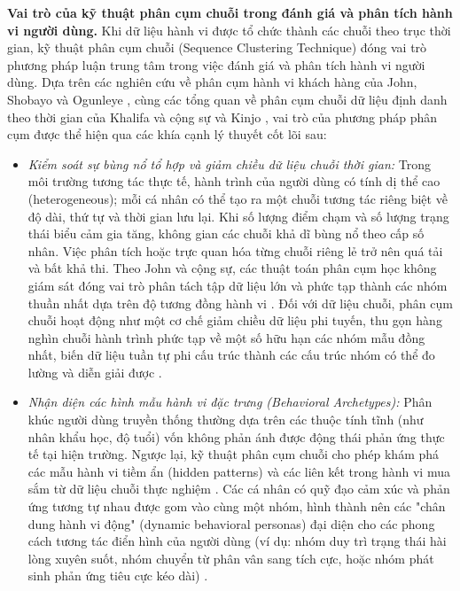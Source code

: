 \documentclass[../LuanVan.tex]{subfiles}
\begin{document}
\noindent\textbf{Vai trò của kỹ thuật phân cụm chuỗi trong đánh giá và phân tích hành vi người dùng.} Khi dữ liệu hành vi được tổ chức thành các chuỗi theo trục thời gian, kỹ thuật phân cụm chuỗi (Sequence Clustering Technique) đóng vai trò phương pháp luận trung tâm trong việc đánh giá và phân tích hành vi người dùng. Dựa trên các nghiên cứu về phân cụm hành vi khách hàng của John, Shobayo và Ogunleye \cite{john2023exploration}, cùng các tổng quan về phân cụm chuỗi dữ liệu định danh theo thời gian của Khalifa và cộng sự \cite{khalifa2026categorical} và Kinjo \cite{kinjo2025analysis}, vai trò của phương pháp phân cụm được thể hiện qua các khía cạnh lý thuyết cốt lõi sau:
\begin{itemize}
    \item \textit{Kiểm soát sự bùng nổ tổ hợp và giảm chiều dữ liệu chuỗi thời gian:} Trong môi trường tương tác thực tế, hành trình của người dùng có tính dị thể cao (heterogeneous); mỗi cá nhân có thể tạo ra một chuỗi tương tác riêng biệt về độ dài, thứ tự và thời gian lưu lại. Khi số lượng điểm chạm và số lượng trạng thái biểu cảm gia tăng, không gian các chuỗi khả dĩ bùng nổ theo cấp số nhân. Việc phân tích hoặc trực quan hóa từng chuỗi riêng lẻ trở nên quá tải và bất khả thi. Theo John và cộng sự, các thuật toán phân cụm học không giám sát đóng vai trò phân tách tập dữ liệu lớn và phức tạp thành các nhóm thuần nhất dựa trên độ tương đồng hành vi \cite{john2023exploration}. Đối với dữ liệu chuỗi, phân cụm chuỗi hoạt động như một cơ chế giảm chiều dữ liệu phi tuyến, thu gọn hàng nghìn chuỗi hành trình phức tạp về một số hữu hạn các nhóm mẫu đồng nhất, biến dữ liệu tuần tự phi cấu trúc thành các cấu trúc nhóm có thể đo lường và diễn giải được \cite{khalifa2026categorical}.
    \item \textit{Nhận diện các hình mẫu hành vi đặc trưng (Behavioral Archetypes):} Phân khúc người dùng truyền thống thường dựa trên các thuộc tính tĩnh (như nhân khẩu học, độ tuổi) vốn không phản ánh được động thái phản ứng thực tế tại hiện trường. Ngược lại, kỹ thuật phân cụm chuỗi cho phép khám phá các mẫu hành vi tiềm ẩn (hidden patterns) và các liên kết trong hành vi mua sắm từ dữ liệu chuỗi thực nghiệm \cite{john2023exploration}. Các cá nhân có quỹ đạo cảm xúc và phản ứng tương tự nhau được gom vào cùng một nhóm, hình thành nên các "chân dung hành vi động" (dynamic behavioral personas) đại diện cho các phong cách tương tác điển hình của người dùng (ví dụ: nhóm duy trì trạng thái hài lòng xuyên suốt, nhóm chuyển từ phân vân sang tích cực, hoặc nhóm phát sinh phản ứng tiêu cực kéo dài) \cite{kinjo2025analysis}.

\end{itemize}
\end{document}
